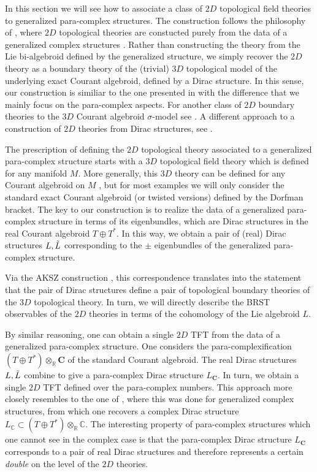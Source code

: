 \documentclass[letterpaper,12pt]{article}
\newcommand{\TT}{{T\oplus T^*}}
\newcommand{\Cc}{\mathbf{C}}
\newcommand{\RR}{\mathbb{R}}
\theoremstyle{definition}
\theoremstyle{remark}
\theoremstyle{examples}
\begin{document}
\def\fg{\mathfrak{g}}

In this section we will see how to associate a class of $2D$ topological field theories to generalized para-complex structures.
The construction follows the philosophy of \cite{Pestun:2006rj}, where $2D$ topological theories are constucted purely from the data of a generalized complex structures \cite{Gualtieri:2003dx}. Rather than constructing the theory from the Lie bi-algebroid defined by the generalized structure, we simply recover the $2D$ theory as a boundary theory of the (trivial) $3D$ topological model of the underlying exact Courant algebroid, defined by a Dirac structure. In this sense, our construction is similiar to the one presented in \cite{Cattaneo:2009zx} with the difference that we mainly focus on the para-complex aspects. For another class of $2D$ boundary theories to the $3D$ Courant algebroid $\sigma$-model see \cite{SeveraTduality}. A different approach to a construction of $2D$ theories from Dirac structures, see \cite{KSSdirac}.

The prescription of defining the $2D$ topological theory associated to a generalized para-complex structure starts with a $3D$ topological field theory which is defined for any manifold $M$. 
More generally, this $3D$ theory can be defined for any Courant algebroid on $M$ \cite{Roytenberg:2002nu}, but for most examples we will only consider the standard exact Courant algebroid (or twisted versions) defined by the Dorfman bracket.
The key to our construction is to realize the data of a generalized para-complex structure in terms of its eigenbundles, which are Dirac structures in the real Courant algebroid $\TT$.
In this way, we obtain a pair of (real) Dirac structures $L, \Tilde{L}$ corresponding to the $\pm$ eigenbundles of the generalized para-complex structure. 

Via the AKSZ construction \cite{AKSZ}, this correspondence translates into the statement that the pair of Dirac structures define a pair of topological boundary theories of the $3D$ topological theory.
In turn, we will directly describe the BRST observables of the $2D$ theories in terms of the cohomology of the Lie algebroid $L$. 

By similar reasoning, one can obtain a single $2D$ TFT from the data of a generalized para-complex structure. 
One considers the para-complexification $(\TT) \otimes_{\RR} \Cc$ of the standard Courant algebroid. 
The real Dirac structures $L, \Tilde{L}$ combine to give a para-complex Dirac structure $L_\Cc$. 
In turn, we obtain a single $2D$ TFT defined over the para-complex numbers. This approach more closely resembles to the one of \cite{Cattaneo:2009zx}, where this was done for generalized complex structures, from which one recovers a complex Dirac structure $L_\mathbb{C}\subset (\TT) \otimes_{\RR} \mathbb{C}$. The interesting property of para-complex structures which one cannot see in the complex case is that the para-complex Dirac structure $L_\Cc$ corresponds to a pair of real Dirac structures and therefore represents a certain {\it double} on the level of the $2D$ theories.  
\end{document}
